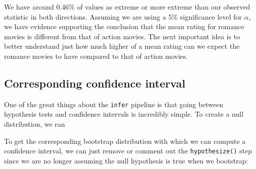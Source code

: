 \documentclass[12pt,]{krantz}
\makeatletter
\newenvironment{Shaded}{\begin{snugshade}}{\end{snugshade}}
\newcommand{\KeywordTok}[1]{\textcolor[rgb]{0.27,0.27,0.27}{\textbf{#1}}}
\newcommand{\DataTypeTok}[1]{\textcolor[rgb]{0.27,0.27,0.27}{#1}}
\newcommand{\DecValTok}[1]{\textcolor[rgb]{0.06,0.06,0.06}{#1}}
\newcommand{\StringTok}[1]{\textcolor[rgb]{0.5,0.5,0.5}{#1}}
\newcommand{\OperatorTok}[1]{\textcolor[rgb]{0.43,0.43,0.43}{\textbf{#1}}}
\newcommand{\NormalTok}[1]{#1}
\newenvironment{kframe}{%
\medskip{}
\setlength{\fboxsep}{.8em}
 \def\at@end@of@kframe{}%
 \ifinner\ifhmode%
  \def\at@end@of@kframe{\end{minipage}}%
  \begin{minipage}{\columnwidth}%
 \fi\fi%
 \def\FrameCommand##1{\hskip\@totalleftmargin \hskip-\fboxsep
 \colorbox{shadecolor}{##1}\hskip-\fboxsep
     \hskip-\linewidth \hskip-\@totalleftmargin \hskip\columnwidth}%
 \MakeFramed {\advance\hsize-\width
   \@totalleftmargin\z@ \linewidth\hsize
   \@setminipage}}%
 {\par\unskip\endMakeFramed%
 \at@end@of@kframe}
\renewenvironment{Shaded}{\begin{kframe}}{\end{kframe}}
\makeatother
\begin{document}
We have around 0.46\% of values as extreme or more extreme than our
observed statistic in both directions. Assuming we are using a 5\%
significance level for \(\alpha\), we have evidence supporting the
conclusion that the mean rating for romance movies is different from
that of action movies. The next important idea is to better understand
just how much higher of a mean rating can we expect the romance movies
to have compared to that of action movies.

\subsection{Corresponding confidence
interval}\label{corresponding-confidence-interval}

One of the great things about the \texttt{infer} pipeline is that going
between hypothesis tests and confidence intervals is incredibly simple.
To create a null distribution, we ran

\begin{Shaded}
\end{Shaded}

To get the corresponding bootstrap distribution with which we can
compute a confidence interval, we can just remove or comment out the
\texttt{hypothesize()} step since we are no longer assuming the null
hypothesis is true when we bootstrap:
\end{document}
